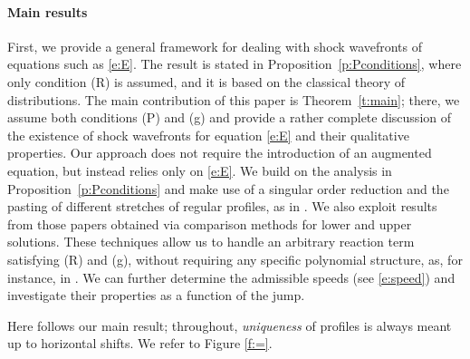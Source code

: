 \documentclass[11pt,a4paper]{article}
\begin{document}
\paragraph{Main results} First, we provide a general framework for dealing with shock wavefronts of equations such as \eqref{e:E}. The result is stated in Proposition~\ref{p:Pconditions}, where only condition (R) is assumed, and it is based on the classical theory of distributions. The main contribution of this paper is Theorem~\ref{t:main}; there, we assume both conditions (P) and (g) and provide a rather complete discussion of the existence of shock wavefronts for equation \eqref{e:E} and their qualitative properties. Our approach does not require the introduction of an augmented equation, but instead relies only on \eqref{e:E}. We build on the analysis in Proposition~\ref{p:Pconditions} and make use of a singular order reduction and the pasting of different stretches of regular profiles, as in \cite{BCM1, BCM2, BCM3, BCM5}. We also exploit results from those papers obtained via comparison methods for lower and upper solutions. These techniques allow us to handle an arbitrary reaction term satisfying (R) and (g), without requiring any specific polynomial structure, as, for instance, in \cite{MTMWBH2}. We can further determine the admissible speeds (see \eqref{e:speed}) and investigate their properties as a function of the jump.



Here follows our main result; throughout, {\em uniqueness} of profiles is always meant up to horizontal shifts. We refer to Figure \ref{f:=}.
\end{document}
